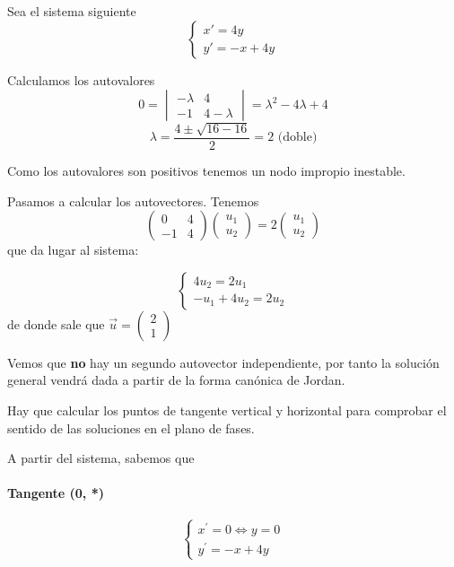 \begin{example}
Sea el sistema siguiente
\begin{equation*}
\left\lbrace 
\begin{array}{l}
	x' = 4y\\
	y'= -x+4y
\end{array}
\right. 
\end{equation*}


Calculamos los autovalores
$$0 = \begin{vmatrix}
-\lambda & 4\\ -1& 4-\lambda
\end{vmatrix} = \lambda^2-4\lambda+4$$
$$\lambda = \frac{4\pm \sqrt{16-16}}{2} = 2\text{ (doble)}$$

Como los autovalores son positivos tenemos un nodo impropio inestable.

Pasamos a calcular los autovectores.
Tenemos
$$\begin{pmatrix}
0& 4\\-1& 4
\end{pmatrix}\begin{pmatrix}
u_1\\u_2
\end{pmatrix} = 2\begin{pmatrix}
u_1\\u_2
\end{pmatrix}$$
que da lugar al sistema:

\begin{equation*}
\left\lbrace 
\begin{array}{l}
	4u_2 = 2u_1\\
	-u_1+4u_2 = 2u_2
\end{array}
\right. 
\end{equation*}
de donde sale que $\vec{u}= \begin{pmatrix}
2\\1
\end{pmatrix}$

Vemos que \textbf{no} hay un segundo autovector independiente, por tanto la solución general vendrá dada a partir de la forma canónica de Jordan.

Hay que calcular los puntos de tangente vertical y horizontal para comprobar el sentido de las soluciones en el plano de fases.

A partir del sistema, sabemos que
\paragraph{Tangente (0, *)}
\begin{equation*}
\left\lbrace 
\begin{array}{l}
	x^\prime = 0 \iff y=0\\
	y^\prime = -x+4y
\end{array}
\right. 
\end{equation*}


\end{example}
